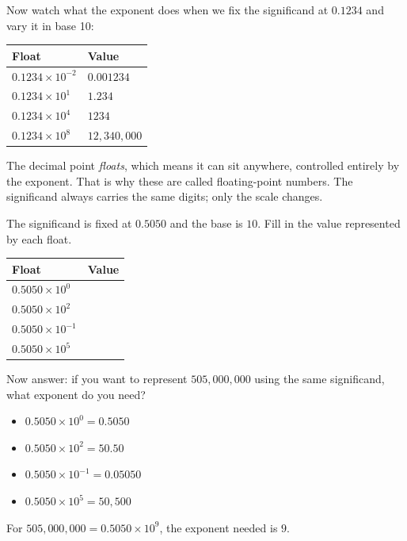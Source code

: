 Now watch what the exponent does when we fix the significand at $0.1234$ and
vary it in base 10:

\begin{center}
\begin{tabular}{ll}
  \hline
  Float                    & Value \\
  \hline
  $0.1234 \times 10^{-2}$  & $0.001234$ \\
  $0.1234 \times 10^{1}$   & $1.234$ \\
  $0.1234 \times 10^{4}$   & $1234$ \\
  $0.1234 \times 10^{8}$   & $12{,}340{,}000$ \\
  \hline
\end{tabular}
\end{center}

The decimal point \emph{floats}, which means it can sit anywhere, controlled entirely
by the exponent.
That is why these are called floating-point numbers.
The significand always carries the same digits; only the scale changes.

\begin{Exercise}[title={The floating point in action}, label={ex:fp-float}]
  The significand is fixed at $0.5050$ and the base is $10$.
  Fill in the value represented by each float.

  \begin{center}
  \begin{tabular}{ll}
    \hline
    Float                    & Value \\
    \hline
    $0.5050 \times 10^{0}$   & \\[6pt]
    $0.5050 \times 10^{2}$   & \\[6pt]
    $0.5050 \times 10^{-1}$  & \\[6pt]
    $0.5050 \times 10^{5}$   & \\[6pt]
    \hline
  \end{tabular}
  \end{center}

  Now answer: if you want to represent $505{,}000{,}000$ using the same
  significand, what exponent do you need?
\end{Exercise}
\begin{Answer}[ref={ex:fp-float}]
  \begin{itemize}
    \item $0.5050 \times 10^{0} = 0.5050$
    \item $0.5050 \times 10^{2} = 50.50$
    \item $0.5050 \times 10^{-1} = 0.05050$
    \item $0.5050 \times 10^{5} = 50{,}500$
  \end{itemize}
  For $505{,}000{,}000 = 0.5050 \times 10^9$, the exponent needed is $9$.
\end{Answer}

